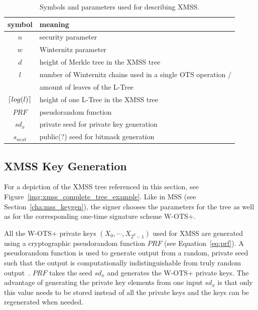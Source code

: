 \begin{table}
\begin{center}
\begin{tabular}{c l} 
 \hline
 symbol & meaning  \\ 
 \hline
 $n$ & security parameter \\ %
 $w$ & Winternitz parameter  \\ 
 $d$ & height of Merkle tree in the XMSS tree  \\ 
 $l$ & number of Winternitz chains used in a single OTS operation / \\ 
     & amount of leaves of the L-Tree \\ 
 $\lceil log(l)\rceil$ & height of one L-Tree in the XMSS tree \\
 $PRF$ & pseudorandom function \\
 $sd_x$ & private seed for private key generation \\
 $s_{next}$ & public(?) seed for bitmask generation  \\
 \hline
\end{tabular}
\caption{Symbols and parameters used for describing XMSS.}
\label{table:xmms_param}
\end{center}
\end{table}

\subsection{XMSS Key Generation}
For a depiction of the XMSS tree referenced in this section, see Figure~\ref{img:xmss_complete_tree_example}. 
Like in MSS (see Section~\ref{cha:mss_keygen}), the signer chooses the parameters for the tree as well as for the corresponding one-time signature scheme W-OTS+.

All the W-OTS+ private keys $(X_0, \cdots, X_{2^d-1})$ used for XMSS are generated using a cryptographic pseudorandom function $PRF$ (see Equation~\ref{eq:prf}). 
A pseudorandom function is used to generate output from a random, private  
seed such that the output is computationally indistinguishable from truly random output~\cite{PRF_source_2016sha}. $PRF$ takes the seed $sd_x$ and generates the W-OTS+ private keys. %
The advantage of generating the private key elements from one input $sd_x$ is that only this value needs to be stored instead of all the private keys and the keys can be regenerated when needed. %

